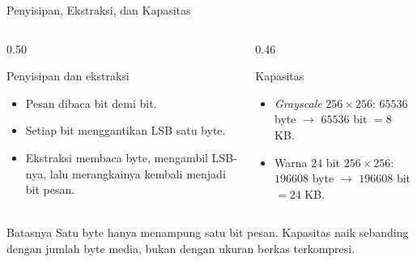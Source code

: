 \documentclass[aspectratio=169,11pt]{beamer}
\begin{document}
\begin{frame}{Penyisipan, Ekstraksi, dan Kapasitas}
    \begin{columns}[T,onlytextwidth]
        \begin{column}{0.50\textwidth}
            \begin{block}{Penyisipan dan ekstraksi}
                \footnotesize
                \begin{itemize}
                    \item Pesan dibaca bit demi bit.
                    \item Setiap bit menggantikan LSB satu byte.
                    \item Ekstraksi membaca byte, mengambil LSB-nya, lalu
                          merangkainya kembali menjadi bit pesan.
                \end{itemize}
            \end{block}
        \end{column}
        \begin{column}{0.46\textwidth}
            \begin{exampleblock}{Kapasitas}
                \footnotesize
                \begin{itemize}
                    \item \textit{Grayscale} $256\times256$:
                          $65536$ byte $\to$ $65536$ bit $=8$ KB.
                    \item Warna $24$ bit $256\times256$:
                          $196608$ byte $\to$ $196608$ bit $=24$ KB.
                \end{itemize}
            \end{exampleblock}
        \end{column}
    \end{columns}
    \vspace{0.15cm}
    \begin{alertblock}{Batasnya}
        \footnotesize
        Satu byte hanya menampung satu bit pesan. Kapasitas naik sebanding
        dengan jumlah byte media, bukan dengan ukuran berkas terkompresi.
    \end{alertblock}
\end{frame}
\end{document}

